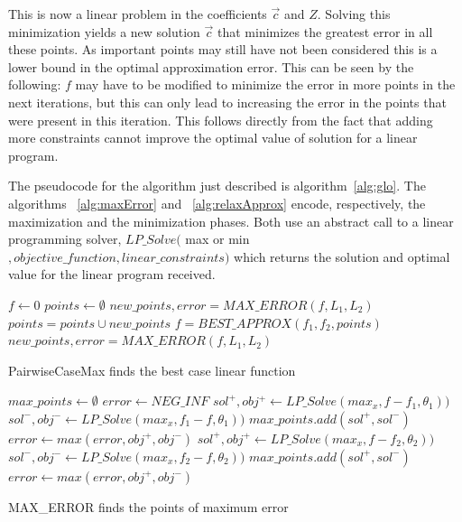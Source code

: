 This is now a linear problem in the coefficients $\vec{c}$ and $Z$. Solving this minimization yields a new solution $\vec{c}$ that minimizes the greatest error in all these points. As important points may still have not been considered this is a lower bound in the optimal approximation error. This can be seen by the following: $f$ may have to be modified to minimize the error in more points in the next iterations, but this can only lead to increasing the error in the points that were present in this iteration. This follows directly from the fact that adding more constraints cannot improve the optimal value of solution for a linear program.

The pseudocode for the algorithm just described is algorithm~\ref{alg:glo}. The algorithms ~\ref{alg:maxError} and ~\ref{alg:relaxApprox} encode, respectively, the maximization and the minimization phases. Both use an abstract call to a linear programming solver, $LP\_Solve($ max or min$, objective\_function, linear\_constraints)$ which returns the solution and optimal value for the linear program received.

\incmargin{1.5em}
\linesnumbered
\begin{algorithm}[!ht]
\dontprintsemicolon
{}
$f \gets 0$\;
$points \gets \emptyset$\;
$new\_points, error = MAX\_ERROR(f, L_1,L_2)$\;
 {
	$points = points \cup new\_points$\;
	$f = BEST\_APPROX(f_1,f_2,points)$\;
	$new\_points, error = MAX\_ERROR(f, L_1,L_2)$\;}
\;
\caption{{\sc PairwiseCaseMax} finds the best case linear function}
\label{alg:glo}
\end{algorithm}
\decmargin{1.5em}

\incmargin{1.5em}
\linesnumbered
\begin{algorithm}[!ht]
\dontprintsemicolon
{}
$max\_points \gets \emptyset$\;
$error \gets NEG\_INF$\;
 {
	$sol^+, obj^+ \gets LP\_Solve(max _x, f-f_1,\theta_1) )$\;
	$sol^-, obj^- \gets LP\_Solve(max _x, f_1-f,\theta_1) )$\;
	$max\_points.add(sol^+,sol^-)$\; 	$error \gets max(error, obj^+, obj^-)$\; 
	}
 {
	$sol^+, obj^+ \gets LP\_Solve(max _x, f-f_2,\theta_2) )$\;
	$sol^-, obj^- \gets LP\_Solve(max _x, f_2-f,\theta_2) )$\;
	$max\_points.add(sol^+,sol^-)$\; 	$error \gets max(error, obj^+, obj^-)$\; 
	}\;
\caption{{\sc MAX\_ERROR} finds the points of maximum error}
\label{alg:maxError}
\end{algorithm}
\decmargin{1.5em}

